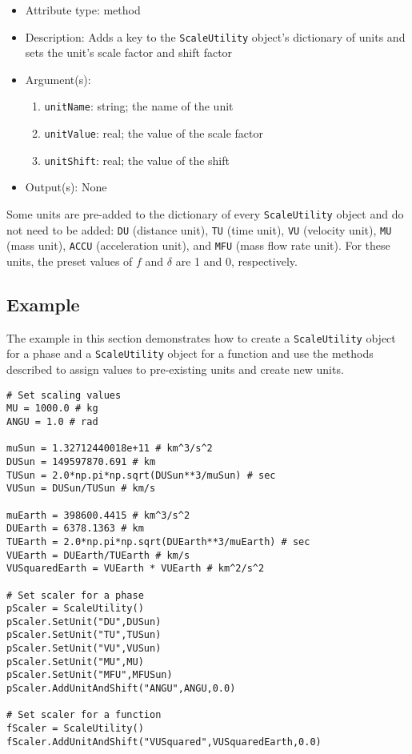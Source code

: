 \documentclass[]{article}
\begin{document}
\begin{itemize}
	\item Attribute type: method
	\item Description: Adds a key to the \texttt{ScaleUtility} object's dictionary of units and sets the unit's scale factor and shift factor
	\item Argument(s):
	\begin{enumerate}
		\item \texttt{unitName}: string; the name of the unit
		\item \texttt{unitValue}: real; the value of the scale factor
		\item \texttt{unitShift}: real; the value of the shift
	\end{enumerate}
	\item Output(s): None
\end{itemize}

Some units are pre-added to the dictionary of every \texttt{ScaleUtility} object and do not need to be added: \texttt{DU} (distance unit), \texttt{TU} (time unit), \texttt{VU} (velocity unit), \texttt{MU} (mass unit), \texttt{ACCU} (acceleration unit), and \texttt{MFU} (mass flow rate unit). For these units, the preset values of $f$ and $\delta$ are 1 and 0, respectively.

\subsection{Example}

The example in this section demonstrates how to create a \texttt{ScaleUtility} object for a phase and a \texttt{ScaleUtility} object for a function and use the methods described to assign values to pre-existing units and create new units.

\begin{verbatim}
# Set scaling values
MU = 1000.0 # kg
ANGU = 1.0 # rad

muSun = 1.32712440018e+11 # km^3/s^2
DUSun = 149597870.691 # km
TUSun = 2.0*np.pi*np.sqrt(DUSun**3/muSun) # sec
VUSun = DUSun/TUSun # km/s

muEarth = 398600.4415 # km^3/s^2
DUEarth = 6378.1363 # km
TUEarth = 2.0*np.pi*np.sqrt(DUEarth**3/muEarth) # sec
VUEarth = DUEarth/TUEarth # km/s
VUSquaredEarth = VUEarth * VUEarth # km^2/s^2

# Set scaler for a phase
pScaler = ScaleUtility()
pScaler.SetUnit("DU",DUSun)
pScaler.SetUnit("TU",TUSun)
pScaler.SetUnit("VU",VUSun)
pScaler.SetUnit("MU",MU)
pScaler.SetUnit("MFU",MFUSun)
pScaler.AddUnitAndShift("ANGU",ANGU,0.0)

# Set scaler for a function
fScaler = ScaleUtility()
fScaler.AddUnitAndShift("VUSquared",VUSquaredEarth,0.0)
\end{verbatim}
\end{document}
